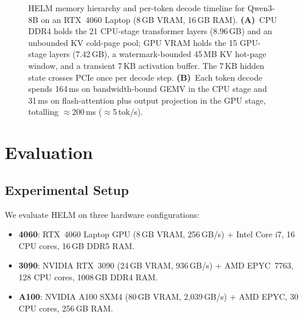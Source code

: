 \documentclass[lettersize,journal]{IEEEtran}
\begin{document}
\begin{figure}[!t]
\caption{HELM memory hierarchy and per-token decode timeline for
Qwen3-8B on an RTX~4060 Laptop (8\,GB VRAM, 16\,GB RAM).
\textbf{(A)}~CPU DDR4 holds the 21 CPU-stage transformer layers (8.96\,GB) and
an unbounded KV cold-page pool; GPU VRAM holds the 15 GPU-stage layers
(7.42\,GB), a watermark-bounded 45\,MB KV hot-page window, and a
transient 7\,KB activation buffer.  The 7\,KB hidden state crosses PCIe
once per decode step.
\textbf{(B)}~Each token decode spends 164\,ms on bandwidth-bound GEMV in
the CPU stage and 31\,ms on flash-attention plus output projection in the GPU
stage, totalling $\approx$200\,ms ($\approx$5\,tok/s).}
\label{fig:memory_timeline}
\end{figure}

\section{Evaluation}
\label{sec:eval}

\subsection{Experimental Setup}

We evaluate HELM on three hardware configurations:

\begin{itemize}
  \item \textbf{4060}: RTX~4060 Laptop GPU (8\,GB VRAM, 256\,GB/s) + Intel Core i7,
        16 CPU cores, 16\,GB DDR5 RAM.
  \item \textbf{3090}: NVIDIA RTX~3090 (24\,GB VRAM, 936\,GB/s) + AMD EPYC~7763,
        128 CPU cores, 1008\,GB DDR4 RAM.
  \item \textbf{A100}: NVIDIA A100 SXM4 (80\,GB VRAM, 2{,}039\,GB/s) + AMD EPYC,
        30 CPU cores, 256\,GB RAM.
\end{itemize}
\end{document}
